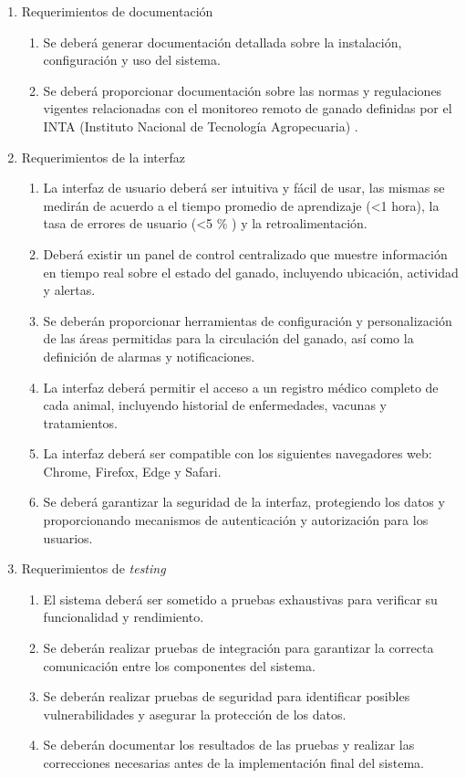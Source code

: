 \documentclass[
11pt, %
]{charter}
\begin{document}
\begin{enumerate}
	\item Requerimientos de documentación
		\begin{enumerate}
			\item Se deberá generar documentación detallada sobre la instalación, configuración y uso del sistema.
			\item Se deberá proporcionar documentación sobre las normas y regulaciones vigentes relacionadas con el monitoreo remoto de ganado definidas por el INTA (Instituto Nacional de Tecnología Agropecuaria) .
		\end{enumerate}
	
	\item Requerimientos de la interfaz
		\begin{enumerate}			
			\item La interfaz de usuario deberá ser intuitiva y fácil de usar, las mismas se medirán de acuerdo a el tiempo promedio de aprendizaje (\textless 1 hora), la tasa de errores de usuario (\textless  5 \% ) y la retroalimentación.
			\item Deberá existir un panel de control centralizado que muestre información en tiempo real sobre el estado del ganado, incluyendo ubicación, actividad y alertas.
			\item  Se deberán proporcionar herramientas de configuración y personalización de las áreas permitidas para la circulación del ganado, así como la definición de alarmas y notificaciones.
			\item La interfaz deberá permitir el acceso a un registro médico completo de cada animal, incluyendo historial de enfermedades, vacunas y tratamientos.
			\item La interfaz deberá ser compatible con los siguientes navegadores web: Chrome, Firefox, Edge y Safari.
			\item Se deberá garantizar la seguridad de la interfaz, protegiendo los datos y proporcionando mecanismos de autenticación y autorización para los usuarios.
		\end{enumerate}
		
	\item Requerimientos de \emph{testing}
		\begin{enumerate}
			\item El sistema deberá ser sometido a pruebas exhaustivas para verificar su funcionalidad y rendimiento.
			\item Se deberán realizar pruebas de integración para garantizar la correcta comunicación entre los componentes del sistema.
			\item Se deberán realizar pruebas de seguridad para identificar posibles vulnerabilidades y asegurar la protección de los datos.
			\item Se deberán documentar los resultados de las pruebas y realizar las correcciones necesarias antes de la implementación final del sistema.
		\end{enumerate}
		
\end{enumerate}
\end{document}
